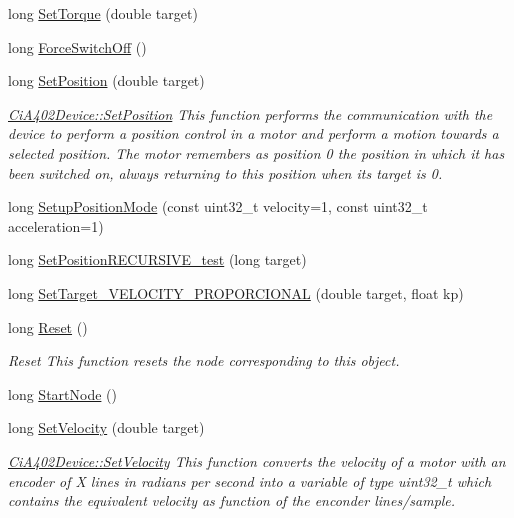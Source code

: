 \begin{DoxyCompactItemize}
long \hyperlink{classCiA402Device_a556c03984774974dd3a1231793916d9b}{Set\+Torque} (double target)
\item 
long \hyperlink{classCiA402Device_aff0503b4caa6d2a8e2e66df6b9e0f4e4}{Force\+Switch\+Off} ()
\item 
long \hyperlink{classCiA402Device_ac13cd5d90f8d39e1ef9734d035e67acb}{Set\+Position} (double target)
\begin{DoxyCompactList}\small\item\em \hyperlink{classCiA402Device_ac13cd5d90f8d39e1ef9734d035e67acb}{Ci\+A402\+Device\+::\+Set\+Position} This function performs the communication with the device to perform a position control in a motor and perform a motion towards a selected position. The motor remembers as position 0 the position in which it has been switched on, always returning to this position when its target is 0. \end{DoxyCompactList}\item 
long \hyperlink{classCiA402Device_a726ff3dfbfc8ae76c01d26277d0b764c}{Setup\+Position\+Mode} (const uint32\+\_\+t velocity=1, const uint32\+\_\+t acceleration=1)
\item 
long \hyperlink{classCiA402Device_ac1c55984abb91928d52b0a49651cc18e}{Set\+Position\+R\+E\+C\+U\+R\+S\+I\+V\+E\+\_\+test} (long target)
\item 
long \hyperlink{classCiA402Device_a1b88a18321d6dbee11258b48d49706ba}{Set\+Target\+\_\+\+V\+E\+L\+O\+C\+I\+T\+Y\+\_\+\+P\+R\+O\+P\+O\+R\+C\+I\+O\+N\+AL} (double target, float kp)
\item 
long \hyperlink{classCiA402Device_ac4a6e4987ebe075d0ac07ee5fd4d410c}{Reset} ()
\begin{DoxyCompactList}\small\item\em Reset This function resets the node corresponding to this object. \end{DoxyCompactList}\item 
long \hyperlink{classCiA402Device_a32b4628098364846fe291312025f6fda}{Start\+Node} ()
\item 
long \hyperlink{classCiA402Device_a498224b82a857197eb2d28beddc74729}{Set\+Velocity} (double target)
\begin{DoxyCompactList}\small\item\em \hyperlink{classCiA402Device_a498224b82a857197eb2d28beddc74729}{Ci\+A402\+Device\+::\+Set\+Velocity} This function converts the velocity of a motor with an encoder of X lines in radians per second into a variable of type uint32\+\_\+t which contains the equivalent velocity as function of the enconder lines/sample. \end{DoxyCompactList}\item 

\end{DoxyCompactItemize}
